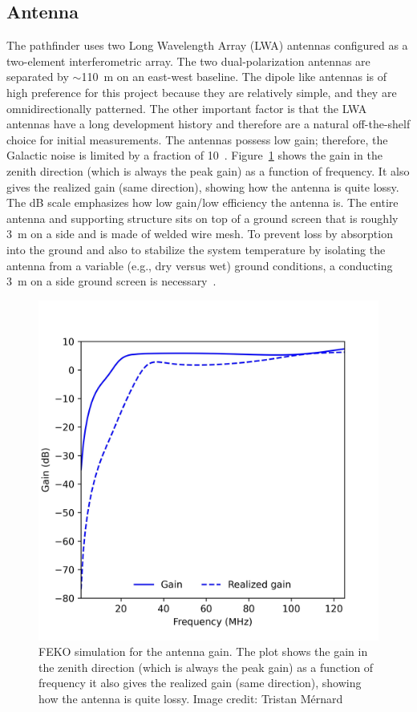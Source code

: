 \subsection{Antenna}\label{s:antenna}

The pathfinder uses two Long Wavelength Array (LWA) antennas configured as a two-element interferometric array. The two dual-polarization antennas are separated by $\sim$\SI{110}{\meter} on an east-west baseline. The dipole like antennas is of high preference for this project because they are relatively simple, and they are omnidirectionally patterned. The other important factor is that the LWA antennas have a long development history and therefore are a natural off-the-shelf choice for initial measurements. The antennas possess low gain; therefore, the Galactic noise is limited by a fraction of 10~\citep{Memo28, Memo27}. Figure~\ref{Fig:LWA_mesh_gain} shows the gain in the zenith direction (which is always the peak gain) as a function of frequency. It also gives the realized gain (same direction), showing how the antenna is quite lossy. The dB scale emphasizes how low gain/low efficiency the antenna is. The entire antenna and supporting structure sits on top of a ground screen that is roughly \SI{3}{\meter} on a side and is made of welded wire mesh. To prevent loss by absorption into the ground and also to stabilize the system temperature by isolating the antenna from a variable (e.g., dry versus wet) ground conditions, a conducting \SI{3}{\meter} on a side ground screen is necessary~\citep{Memo157}.

\begin{figure}
	\centering
	\includegraphics[width=0.7\linewidth]{Figures/LWA_mesh_gain}
	\caption{FEKO simulation for the antenna gain. The plot shows the gain in the zenith direction (which is always the peak gain) as a function of frequency it also gives the realized gain (same direction), showing how the antenna is quite lossy. Image credit: Tristan M\'ernard}
	\label{Fig:LWA_mesh_gain}
\end{figure}


